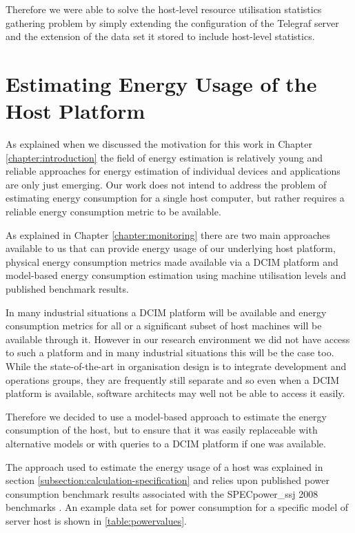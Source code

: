 Therefore we were able to solve the host-level resource utilisation statistics gathering problem by simply extending the configuration of the Telegraf server and the extension of the data set it stored to include host-level statistics.

\section{Estimating Energy Usage of the Host Platform}

As explained when we discussed the motivation for this work in Chapter \ref{chapter:introduction} the field of energy estimation is relatively young and reliable approaches for energy estimation of individual devices and applications are only just emerging.  Our work does not intend to address the problem of estimating energy consumption for a single host computer, but rather requires a reliable energy consumption metric to be available.

As explained in Chapter \ref{chapter:monitoring} there are two main approaches available to us that can provide energy usage of our underlying host platform, physical energy consumption metrics made available via a DCIM platform and model-based energy consumption estimation using machine utilisation levels and published benchmark results.

In many industrial situations a DCIM platform will be available and energy consumption metrics for all or a significant subset of host machines will be available through it.  However in our research environment we did not have access to such a platform and in many industrial situations this will be the case too.  While the state-of-the-art in organisation design is to integrate development and operations groups, they are frequently still separate and so even when a DCIM platform is available, software architects may well not be able to access it easily.

Therefore we decided to use a model-based approach to estimate the energy consumption of the host, but to ensure that it was easily replaceable with alternative models or with queries to a DCIM platform if one was available.

The approach used to estimate the energy usage of a host was explained in section \ref{subsection:calculation-specification} and relies upon published power consumption benchmark results associated with the SPECpower\_ssj 2008 benchmarks \cite{lange2009-specpower}.  An example data set for power consumption for a specific model of server host is shown in \ref{table:powervalues}.

